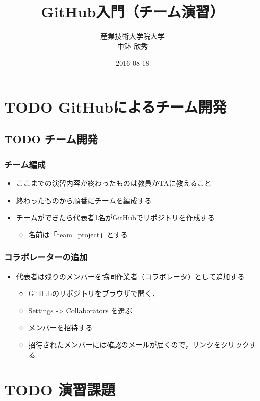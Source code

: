 \documentclass[a4paper,twoside,twocolumn]{bxjsarticle}
\author{産業技術大学院大学\\ 中鉢 欣秀}
\date{2016-08-18}
\title{GitHub入門（チーム演習）}
\begin{document}
\maketitle

\section{{\bfseries\sffamily TODO} GitHubによるチーム開発}
\label{sec-1}
\subsection{{\bfseries\sffamily TODO} チーム開発}
\label{sec-1-1}
\subsubsection{チーム編成}
\label{sec-1-1-1}
\begin{itemize}
\item ここまでの演習内容が終わったものは教員かTAに教えること
\item 終わったものから順番にチームを編成する
\item チームができたら代表者1名がGitHubでリポジトリを作成する
\begin{itemize}
\item 名前は「team\_project」とする
\end{itemize}
\end{itemize}

\subsubsection{コラボレーターの追加}
\label{sec-1-1-2}
\begin{itemize}
\item 代表者は残りのメンバーを協同作業者（コラボレータ）として追加する
\begin{itemize}
\item GitHubのリポジトリをブラウザで開く．
\item Settings -> Collaborators を選ぶ
\item メンバーを招待する
\item 招待されたメンバーには確認のメールが届くので，リンクをクリックする
\end{itemize}
\end{itemize}

\section{{\bfseries\sffamily TODO} 演習課題}
\label{sec-2}
\end{document}

